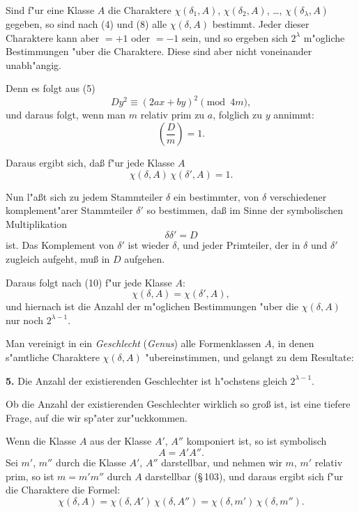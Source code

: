 \documentclass[11pt,a4paper]{article}
\theoremstyle{plain}
\newcommand{\sect}[1]{\S\,#1}
\begin{document}
Sind f"{u}r eine Klasse $A$ die Charaktere $\chi(\delta_1, A)$, $\chi(\delta_2, A)$, \dots, $\chi(\delta_\lambda, A)$ gegeben, so sind nach (4) und (8) alle $\chi(\delta, A)$ bestimmt. Jeder dieser Charaktere kann aber $= +1$ oder $= -1$ sein, und so ergeben sich $2^\lambda$ m"{o}gliche Bestimmungen "{u}ber die Charaktere. Diese sind aber nicht voneinander unabh"{a}ngig.

Denn es folgt aus (5)
\[
Dy^2 \equiv (2ax + by)^2 \pmod{4m},
\]
und daraus folgt, wenn man $m$ relativ prim zu $a$, folglich zu $y$ annimmt:
\begin{equation}
\label{eq:104_10a}
\left(\frac{D}{m}\right) = 1.
\end{equation}

Daraus ergibt sich, da\ss{} f"{u}r jede Klasse $A$
\begin{equation}
\label{eq:104_10}
\chi(\delta, A)\,\chi(\delta', A) = 1.
\end{equation}

Nun l"{a}\ss{}t sich zu jedem Stammteiler $\delta$ ein bestimmter, von $\delta$ verschiedener komplement"{a}rer Stammteiler $\delta'$ so bestimmen, da\ss{} im Sinne der symbolischen Multiplikation
\begin{equation}
\label{eq:104_11}
\delta\delta' = D
\end{equation}
ist. Das Komplement von $\delta'$ ist wieder $\delta$, und jeder Primteiler, der in $\delta$ und $\delta'$ zugleich aufgeht, mu\ss{} in $D$ aufgehen.

Daraus folgt nach (10) f"{u}r jede Klasse $A$:
\begin{equation}
\label{eq:104_12}
\chi(\delta, A) = \chi(\delta', A),
\end{equation}
und hiernach ist die Anzahl der m"{o}glichen Bestimmungen "{u}ber die $\chi(\delta, A)$ nur noch $2^{\lambda-1}$.

Man vereinigt in ein \emph{Geschlecht} (\emph{Genus}) alle Formenklassen $A$, in denen s"{a}mtliche Charaktere $\chi(\delta, A)$ "{u}bereinstimmen, und gelangt zu dem Resultate:

\smallskip

\textbf{5.} Die Anzahl der existierenden Geschlechter ist h"{o}chstens gleich $2^{\lambda-1}$.

Ob die Anzahl der existierenden Geschlechter wirklich so gro\ss{} ist, ist eine tiefere Frage, auf die wir sp"{a}ter zur"{u}ckkommen.

\newpage
\setcounter{page}{383}

Wenn die Klasse $A$ aus der Klasse $A'$, $A''$ komponiert ist, so ist symbolisch
\[
A = A'A''.
\]
Sei $m'$, $m''$ durch die Klasse $A'$, $A''$ darstellbar, und nehmen wir $m$, $m'$ relativ prim, so ist $m = m'm''$ durch $A$ darstellbar (\sect{103}), und daraus ergibt sich f"{u}r die Charaktere die Formel:
\begin{equation}
\label{eq:104_13}
\chi(\delta, A) = \chi(\delta, A')\,\chi(\delta, A'') = \chi(\delta, m')\,\chi(\delta, m'').
\end{equation}
\end{document}
